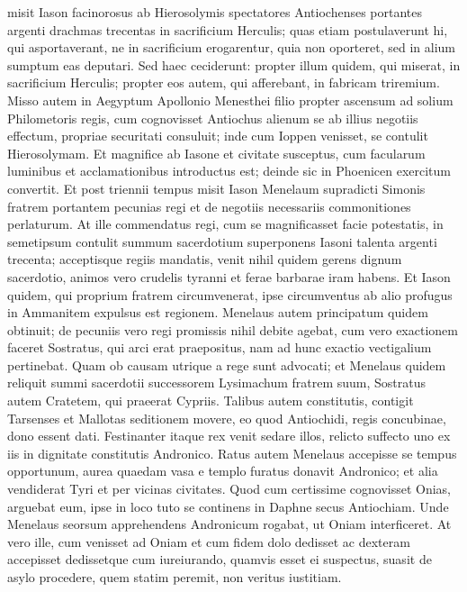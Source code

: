 \begin{biblechapter}
\begin{biblechapter}
\begin{biblechapter}
\begin{biblechapter}
\verse misit Iason facinorosus ab Hierosolymis spectatores Antiochenses portantes argenti drachmas trecentas in sacrificium Herculis; quas etiam postulaverunt hi, qui asportaverant, ne in sacrificium erogarentur, quia non oporteret, sed in alium sumptum eas deputari. 
\verse Sed haec ceciderunt: propter illum quidem, qui miserat, in sacrificium Herculis; propter eos autem, qui afferebant, in fabricam triremium. 
\verse Misso autem in Aegyptum Apollonio Menesthei filio propter ascensum ad solium Philometoris regis, cum cognovisset Antiochus alienum se ab illius negotiis effectum, propriae securitati consuluit; inde cum Ioppen venisset, se contulit Hierosolymam. 
\verse Et magnifice ab Iasone et civitate susceptus, cum facularum luminibus et acclamationibus introductus est; deinde sic in Phoenicen exercitum convertit.
 \verse Et post triennii tempus misit Iason Menelaum supradicti Simonis fratrem portantem pecunias regi et de negotiis necessariis commonitiones perlaturum. 
 \verse At ille commendatus regi, cum se magnificasset facie potestatis, in semetipsum contulit summum sacerdotium superponens Iasoni talenta argenti trecenta; 
\verse acceptisque regiis mandatis, venit nihil quidem gerens dignum sacerdotio, animos vero crudelis tyranni et ferae barbarae iram habens. 
\verse Et Iason quidem, qui proprium fratrem circumvenerat, ipse circumventus ab alio profugus in Ammanitem expulsus est regionem. 
\verse Menelaus autem principatum quidem obtinuit; de pecuniis vero regi promissis nihil debite agebat, 
\verse cum vero exactionem faceret Sostratus, qui arci erat praepositus, nam ad hunc exactio vectigalium pertinebat. Quam ob causam utrique a rege sunt advocati; 
 \verse et Menelaus quidem reliquit summi sacerdotii successorem Lysimachum fratrem suum, Sostratus autem Cratetem, qui praeerat Cypriis.
 \verse Talibus autem constitutis, contigit Tarsenses et Mallotas seditionem movere, eo quod Antiochidi, regis concubinae, dono essent dati. 
\verse Festinanter itaque rex venit sedare illos, relicto suffecto uno ex iis in dignitate constitutis Andronico. 
\verse Ratus autem Menelaus accepisse se tempus opportunum, aurea quaedam vasa e templo furatus donavit Andronico; et alia vendiderat Tyri et per vicinas civitates. 
\verse Quod cum certissime cognovisset Onias, arguebat eum, ipse in loco tuto se continens in Daphne secus Antiochiam. 
 \verse Unde Menelaus seorsum apprehendens Andronicum rogabat, ut Oniam interficeret. At vero ille, cum venisset ad Oniam et cum fidem dolo dedisset ac dexteram accepisset dedissetque cum iureiurando, quamvis esset ei suspectus, suasit de asylo procedere, quem statim peremit, non veritus iustitiam. 

\end{biblechapter}
\end{biblechapter}
\end{biblechapter}
\end{biblechapter}
